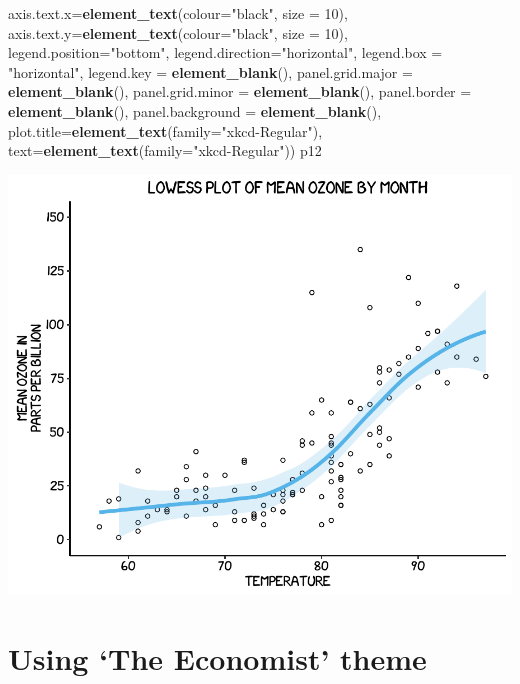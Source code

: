 \documentclass[]{article}
\newenvironment{Shaded}{\begin{snugshade}}{\end{snugshade}}
\newcommand{\KeywordTok}[1]{\textcolor[rgb]{0.13,0.29,0.53}{\textbf{{#1}}}}
\newcommand{\DataTypeTok}[1]{\textcolor[rgb]{0.13,0.29,0.53}{{#1}}}
\newcommand{\DecValTok}[1]{\textcolor[rgb]{0.00,0.00,0.81}{{#1}}}
\newcommand{\StringTok}[1]{\textcolor[rgb]{0.31,0.60,0.02}{{#1}}}
\newcommand{\NormalTok}[1]{{#1}}
\begin{document}
\begin{Shaded}
\begin{Highlighting}[]
    \DataTypeTok{axis.text.x=}\KeywordTok{element_text}\NormalTok{(}\DataTypeTok{colour=}\StringTok{"black"}\NormalTok{, }\DataTypeTok{size =} \DecValTok{10}\NormalTok{), }
    \DataTypeTok{axis.text.y=}\KeywordTok{element_text}\NormalTok{(}\DataTypeTok{colour=}\StringTok{"black"}\NormalTok{, }\DataTypeTok{size =} \DecValTok{10}\NormalTok{), }
    \DataTypeTok{legend.position=}\StringTok{"bottom"}\NormalTok{, }
    \DataTypeTok{legend.direction=}\StringTok{"horizontal"}\NormalTok{,}
    \DataTypeTok{legend.box =} \StringTok{"horizontal"}\NormalTok{, }
    \DataTypeTok{legend.key =} \KeywordTok{element_blank}\NormalTok{(),}
    \DataTypeTok{panel.grid.major =} \KeywordTok{element_blank}\NormalTok{(),}
    \DataTypeTok{panel.grid.minor =} \KeywordTok{element_blank}\NormalTok{(), }
    \DataTypeTok{panel.border =} \KeywordTok{element_blank}\NormalTok{(),}
    \DataTypeTok{panel.background =} \KeywordTok{element_blank}\NormalTok{(),}
    \DataTypeTok{plot.title=}\KeywordTok{element_text}\NormalTok{(}\DataTypeTok{family=}\StringTok{"xkcd-Regular"}\NormalTok{), }
    \DataTypeTok{text=}\KeywordTok{element_text}\NormalTok{(}\DataTypeTok{family=}\StringTok{"xkcd-Regular"}\NormalTok{)) }
\NormalTok{p12}
\end{Highlighting}
\end{Shaded}

\begin{center}\includegraphics{12_Lowess_Plots_pdf/lowess_18-1} \end{center}

\section{\texorpdfstring{Using `The Economist'
theme}{Using The Economist theme}}\label{using-the-economist-theme}
\end{document}
